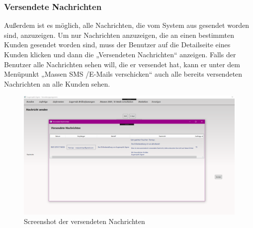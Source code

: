 \subsubsection{Versendete Nachrichten}
Außerdem ist es möglich, alle Nachrichten, die vom System aus gesendet worden sind, anzuzeigen. Um nur Nachrichten anzuzeigen, die an einen bestimmten Kunden gesendet worden sind, muss der Benutzer auf die Detailseite eines Kunden klicken und dann die „Versendeten Nachrichten“ anzeigen. Falls der Benutzer alle Nachrichten sehen will, die er versendet hat, kann er unter dem Menüpunkt „Massen SMS /E-Mails verschicken“ auch alle bereits versendeten Nachrichten an alle Kunden sehen.
\begin{figure}[H]
\begin{center}
	\includegraphics[scale=.25]{images/VersendeteNachrichten.png}
\end{center}
	\caption{Screenshot der versendeten Nachrichten}
	\label{fig:sample}
\end{figure}



